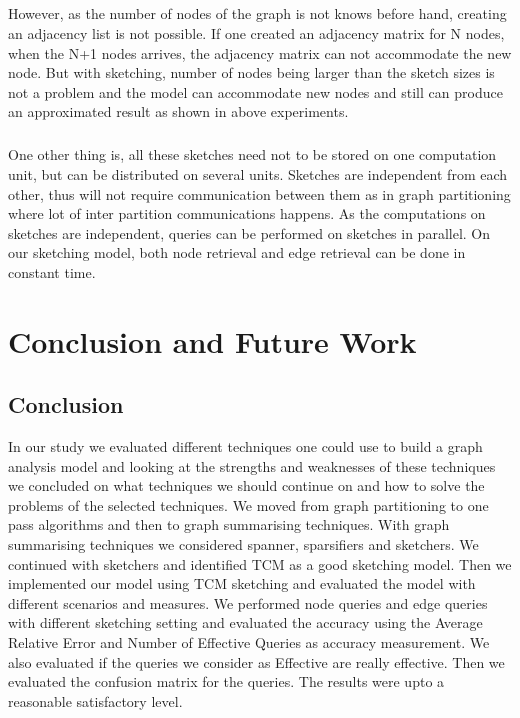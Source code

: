 \documentclass[12pt]{report}
\numberwithin{figure}{section}
\numberwithin{table}{section}
\begin{document}
\paragraph{}

However, as the number of nodes of the graph is not knows before hand, creating an adjacency list is not possible. If one created an adjacency matrix for N nodes, when the N+1 nodes arrives, the adjacency matrix can not accommodate the new node. But with sketching, number of nodes being larger than the sketch sizes is not a problem and the model can accommodate new nodes and still can produce an approximated result as shown in above experiments. 

\paragraph{}

One other thing is, all these sketches need not to be stored on one computation unit, but can be distributed on several units. Sketches are independent from each other, thus will not require communication between them as in graph partitioning where lot of inter partition communications happens. As the computations on sketches are independent, queries can be performed on sketches in parallel. On our sketching model, both node retrieval and edge retrieval can be done in constant time.  


\chapter{Conclusion and Future Work }

\section{Conclusion}

In our study we evaluated different techniques one could use to build a graph analysis model and looking at the strengths and weaknesses of these techniques we concluded on what techniques we should continue on and  how to solve the problems of the selected techniques. We moved from graph partitioning to one pass algorithms and then to graph summarising techniques. With graph summarising techniques we considered spanner, sparsifiers and sketchers. We continued with sketchers and identified TCM as a good sketching model. Then we implemented our model using TCM sketching and evaluated  the model with different scenarios and measures. We performed node queries and edge queries with different sketching setting and evaluated the accuracy using the Average Relative Error and Number of Effective Queries as accuracy  measurement. We also evaluated if the queries we consider as Effective are really effective. Then we evaluated the confusion matrix for the queries. The results were upto a reasonable satisfactory level. 
\end{document}
